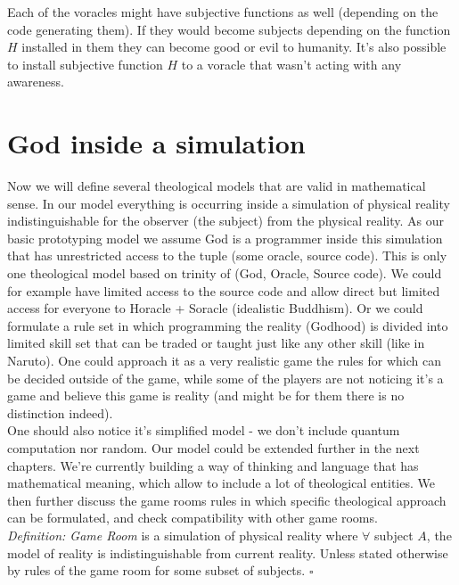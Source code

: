 \documentclass{article}
\begin{document}
Each of the voracles might have subjective functions as well (depending on the code generating them). If they would become subjects depending on the function $H$ installed in them they can become good or evil to humanity. It's also possible to install subjective function $H$ to a voracle that wasn't acting with any awareness. 

\section{God inside a simulation}

Now we will define several theological models that are valid in mathematical sense. In our model everything is occurring inside a simulation of physical reality indistinguishable for the observer (the subject) from the physical reality. As our basic prototyping model we assume God is a programmer inside this simulation that has unrestricted access to the tuple (some oracle, source code). This is only one theological model based on trinity of (God, Oracle, Source code). We could for example have limited access to the source code and allow direct but limited access for everyone to Horacle + Soracle (idealistic Buddhism). Or we could formulate a rule set in which programming the reality (Godhood) is divided into limited skill set that can be traded or taught just like any other skill (like in Naruto). One could approach it as a very realistic game the rules for which can be decided outside of the game, while some of the players are not noticing it's a game and believe this game is reality (and might be for them there is no distinction indeed).\\

One should also notice it's simplified model - we don't include quantum computation nor random. Our model could be extended further in the next chapters. We're currently building a way of thinking and language that has mathematical meaning, which allow to include a lot of theological entities. We then further discuss the game rooms rules in which specific theological approach can be formulated, and check compatibility with other game rooms. \\

\textit{Definition: Game Room} is a simulation of physical reality where $\forall$ subject $A$, the model of reality is indistinguishable from current reality. Unless stated otherwise by rules of the game room for some subset of subjects. $\square$ \\
\end{document}
